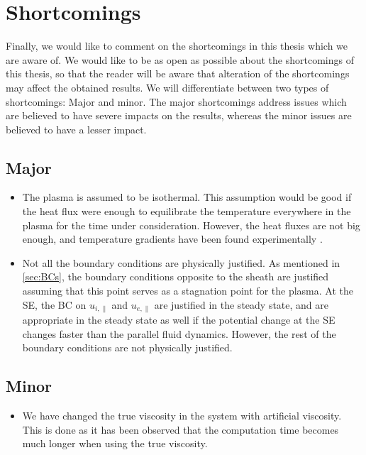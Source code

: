 \section{Shortcomings}
\label{app:shortcomings}
%
Finally, we would like to comment on the shortcomings in this thesis which we are aware of.
We would like to be as open as possible about the shortcomings of this thesis, so that the reader will be aware that alteration of the shortcomings may affect the obtained results.
We will differentiate between two types of shortcomings:
Major and minor.
The major shortcomings address issues which are believed to have severe impacts on the results, whereas the minor issues are believed to have a lesser impact.

\subsection{Major}
\begin{itemize}[noitemsep,nolistsep]
    \item The plasma is assumed to be isothermal.
        This assumption would be good if the heat flux were enough to equilibrate the temperature everywhere in the plasma for the time under consideration.
        However, the heat fluxes are not big enough, and temperature gradients have been found experimentally \cite{Schroder2003Phd}.
    \item Not all the boundary conditions are physically justified.
        As mentioned in \cref{sec:BCs}, the boundary conditions opposite to the sheath are justified assuming that this point serves as a stagnation point for the plasma.
        At the SE, the BC on $u_{i,\|}$ and $u_{e,\|}$ are justified in the steady state, and are appropriate in the steady state as well if the potential change at the SE changes faster than the parallel fluid dynamics.
        However, the rest of the boundary conditions are not physically justified.
\end{itemize}

\subsection{Minor}
\begin{itemize}[noitemsep,nolistsep]
    \item We have changed the true viscosity in the system with artificial viscosity.
        This is done as it has been observed that the computation time becomes much longer when using the true viscosity.
\end{itemize}
